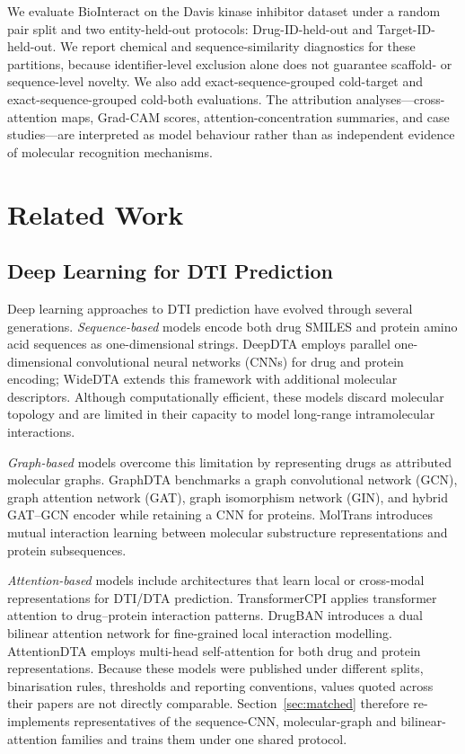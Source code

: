 \documentclass[fleqn,10pt]{wlscirep}
\begin{document}
We evaluate BioInteract on the Davis kinase inhibitor
dataset\cite{davis2011comprehensive} under a random pair split and two
entity-held-out protocols: Drug-ID-held-out and Target-ID-held-out. We report
chemical and sequence-similarity
diagnostics for these partitions, because identifier-level exclusion alone does
not guarantee scaffold- or sequence-level novelty.  We also add
exact-sequence-grouped cold-target and exact-sequence-grouped cold-both
evaluations.  The attribution
analyses---cross-attention maps, Grad-CAM scores, attention-concentration
summaries, and case studies---are interpreted as model behaviour rather than as
independent evidence of molecular recognition mechanisms.

\section{Related Work}
\label{sec:related}

\subsection{Deep Learning for DTI Prediction}

Deep learning approaches to DTI prediction have evolved through several
generations.\cite{wen2017deep}  \emph{Sequence-based} models encode both
drug SMILES and protein amino acid sequences as one-dimensional strings.
DeepDTA\cite{ozturk2018deepdta} employs parallel one-dimensional convolutional
neural networks (CNNs) for drug and
protein encoding; WideDTA\cite{ozturk2019widedta} extends this framework
with additional molecular descriptors.  Although computationally efficient, these
models discard molecular topology and are limited in their capacity to model
long-range intramolecular interactions.

\emph{Graph-based} models overcome this limitation by representing drugs as
attributed molecular graphs.  GraphDTA\cite{nguyen2021graphdta} benchmarks a
graph convolutional network (GCN), graph attention network (GAT), graph
isomorphism network (GIN), and hybrid GAT--GCN encoder while retaining a CNN
for proteins.  MolTrans\cite{huang2021moltrans} introduces mutual
interaction learning between molecular substructure representations and protein
subsequences.

\emph{Attention-based} models include architectures that learn local or
cross-modal representations for DTI/DTA prediction.
TransformerCPI\cite{chen2020transformercpi} applies transformer attention to
drug--protein interaction patterns.  DrugBAN\cite{bai2023drugban} introduces
a dual bilinear attention network for fine-grained local interaction modelling.
AttentionDTA\cite{zhao2022attentiondta} employs multi-head self-attention for
both drug and protein representations.
Because these models were published under different splits, binarisation rules,
thresholds and reporting conventions, values quoted across their papers are not
directly comparable.  Section~\ref{sec:matched} therefore re-implements
representatives of the sequence-CNN, molecular-graph and bilinear-attention
families and trains them under one shared protocol.
\end{document}
